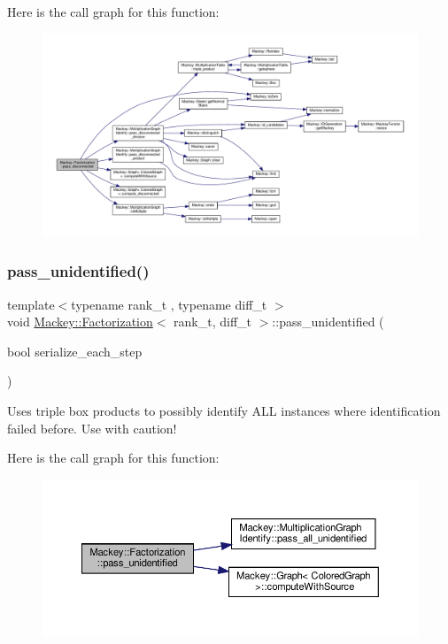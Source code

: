 Here is the call graph for this function\+:\nopagebreak
\begin{figure}[H]
\begin{center}
\leavevmode
\includegraphics[width=350pt]{classMackey_1_1Factorization_aad2d840b523d193f4c3554e9e3f7fb00_cgraph}
\end{center}
\end{figure}
\mbox{\label{classMackey_1_1Factorization_a0f1115a0af9f4fb294646aee85ebb2e4}} 
\subsubsection{\texorpdfstring{pass\+\_\+unidentified()}{pass\_unidentified()}}
{\footnotesize\ttfamily template$<$typename rank\+\_\+t , typename diff\+\_\+t $>$ \\
void \hyperlink{classMackey_1_1Factorization}{Mackey\+::\+Factorization}$<$ rank\+\_\+t, diff\+\_\+t $>$\+::pass\+\_\+unidentified (\begin{DoxyParamCaption}\item[{bool}]{serialize\+\_\+each\+\_\+step }\end{DoxyParamCaption})}



Uses triple box products to possibly identify A\+LL instances where identification failed before. Use with caution! 

Here is the call graph for this function\+:\nopagebreak
\begin{figure}[H]
\begin{center}
\leavevmode
\includegraphics[width=350pt]{classMackey_1_1Factorization_a0f1115a0af9f4fb294646aee85ebb2e4_cgraph}
\end{center}
\end{figure}


